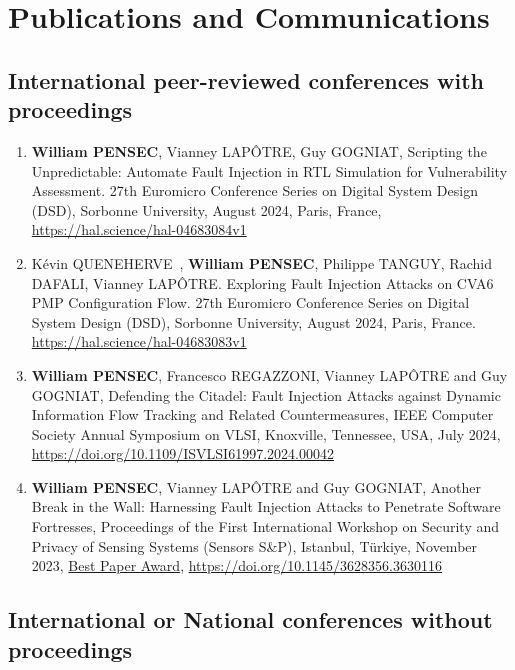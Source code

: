 \chapter{Publications and Communications}
\label{chapter:publi}
\section{International peer-reviewed conferences with proceedings}

\begin{enumerate}
    \item \textbf{William PENSEC}, Vianney LAPÔTRE, Guy GOGNIAT, Scripting the Unpredictable: Automate Fault Injection in RTL Simulation for Vulnerability Assessment. 27th Euromicro Conference Series on Digital System Design (DSD), Sorbonne University, August 2024, Paris, France, \url{https://hal.science/hal-04683084v1}
    \item Kévin QUENEHERVE~\cite{QPTDL-24-dsd}, \textbf{William PENSEC}, Philippe TANGUY, Rachid DAFALI, Vianney LAPÔTRE. Exploring Fault Injection Attacks on CVA6 PMP Configuration Flow. 27th Euromicro Conference Series on Digital System Design (DSD), Sorbonne University, August 2024, Paris, France. \url{https://hal.science/hal-04683083v1}
    \item \textbf{William PENSEC}, Francesco REGAZZONI, Vianney LAPÔTRE and Guy GOGNIAT, Defending the Citadel: Fault Injection Attacks against Dynamic Information Flow Tracking and Related Countermeasures, IEEE Computer Society Annual Symposium on VLSI, Knoxville, Tennessee, USA, July 2024, \url{https://doi.org/10.1109/ISVLSI61997.2024.00042}
    \item\textbf{William PENSEC}, Vianney LAPÔTRE and Guy GOGNIAT, Another Break in the Wall: Harnessing Fault Injection Attacks to Penetrate Software Fortresses, Proceedings of the First International Workshop on Security and Privacy of Sensing Systems (Sensors S\&P), Istanbul, Türkiye, November 2023, \underline{Best Paper Award}, \url{https://doi.org/10.1145/3628356.3630116}
\end{enumerate}
\section{International or National conferences without proceedings}

